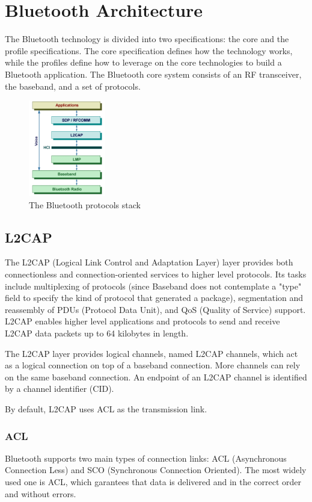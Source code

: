 \section{Bluetooth Architecture}
The Bluetooth technology is divided into two specifications: the core and the profile specifications. The core specification defines how the technology works, while the profiles define how to leverage on the core technologies to build a Bluetooth application.
The Bluetooth core system consists of an RF transceiver, the baseband, and a set of protocols.

\begin{figure}[h!]
  \centering
  \includegraphics[width=0.3\textwidth]{img/bluetooth_protocol_stack.png} 
  \caption{The Bluetooth protocols stack}
\end{figure}

\subsection{L2CAP}
The L2CAP (Logical Link Control and Adaptation Layer) layer provides both connectionless and connection-oriented services to higher level protocols. Its tasks include multiplexing of protocols (since Baseband does not contemplate a "type" field to specify the kind of protocol that generated a package), segmentation and reassembly of PDUs (Protocol Data Unit), and QoS (Quality of Service) support.
L2CAP enables higher level applications and protocols to send and receive L2CAP data packets up to 64 kilobytes in length.

The L2CAP layer provides logical channels, named L2CAP channels, which act as a logical connection on top of a baseband connection.
More channels can rely on the same baseband connection.
An endpoint of an L2CAP channel is identified by a channel identifier (CID).

By default, L2CAP uses ACL as the transmission link.

\subsubsection{ACL}
Bluetooth supports two main types of connection links: ACL (Asynchronous Connection Less) and SCO (Synchronous Connection Oriented).
The most widely used one is ACL, which garantees that data is delivered and in the correct order and without errors.

